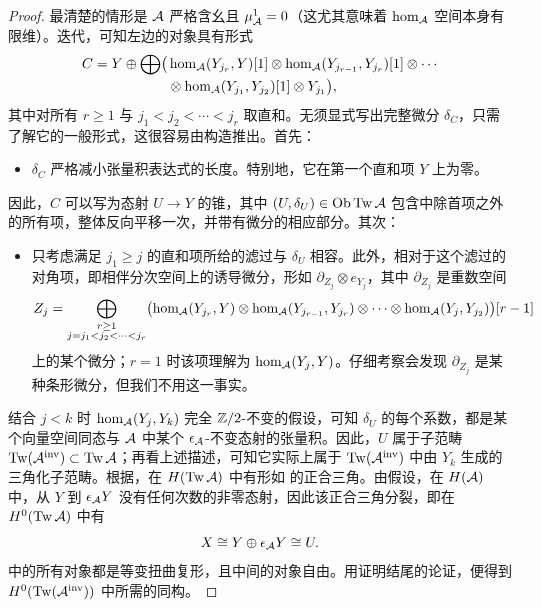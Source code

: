 \begin{proof}
最清楚的情形是 $\mathcal A$ 严格含幺且 $\mu^1_{\mathcal A}=0$（这尤其意味着 $\hom_{\mathcal A}$ 空间本身有限维）。迭代，可知左边的对象具有形式
\begin{equation}\label{eq:6.3}
\begin{aligned}
C=Y\oplus\bigoplus\bigl(&\hom_{\mathcal A}(Y_{j_r},Y)[1]\otimes\hom_{\mathcal A}(Y_{j_{r-1}},Y_{j_r})[1]\otimes\cdots\\[-2pt]
&\otimes\hom_{\mathcal A}(Y_{j_1},Y_{j_2})[1]\otimes Y_{j_1}\bigr),
\end{aligned}
\end{equation}
其中对所有 $r\geq1$ 与 $j_1<j_2<\cdots<j_r$ 取直和。无须显式写出完整微分 $\delta_C$，只需了解它的一般形式，这很容易由构造推出。首先：
\begin{itemize}
\item $\delta_C$ 严格减小张量积表达式的长度。特别地，它在第一个直和项 $Y$ 上为零。
\end{itemize}
因此，$C$ 可以写为态射 $U\to Y$ 的锥，其中 $(U,\delta_U)\in\operatorname{Ob}\operatorname{Tw}\mathcal A$ 包含中除首项之外的所有项，整体反向平移一次，并带有微分的相应部分。其次：
\begin{itemize}
\item 只考虑满足 $j_1\geq j$ 的直和项所给的滤过与 $\delta_U$ 相容。此外，相对于这个滤过的对角项，即相伴分次空间上的诱导微分，形如 $\partial_{Z_j}\otimes e_{Y_j}$，其中 $\partial_{Z_j}$ 是重数空间
\[
Z_j=\bigoplus_{\substack{r\geq1\\j=j_1<j_2<\cdots<j_r}}
\bigl(\hom_{\mathcal A}(Y_{j_r},Y)\otimes\hom_{\mathcal A}(Y_{j_{r-1}},Y_{j_r})\otimes\cdots\otimes\hom_{\mathcal A}(Y_j,Y_{j_2})\bigr)[r-1]
\]
上的某个微分；$r=1$ 时该项理解为 $\hom_{\mathcal A}(Y_j,Y)$。仔细考察会发现 $\partial_{Z_j}$ 是某种条形微分，但我们不用这一事实。
\end{itemize}
结合 $j<k$ 时 $\hom_{\mathcal A}(Y_j,Y_k)$ 完全 $\mathbb Z/2$-不变的假设，可知 $\delta_U$ 的每个系数，都是某个向量空间同态与 $\mathcal A$ 中某个 $\epsilon_{\mathcal A}$-不变态射的张量积。因此，$U$ 属于子范畴 $\operatorname{Tw}(\mathcal A^{\mathrm{inv}})\subset\operatorname{Tw}\mathcal A$；再看上述描述，可知它实际上属于 $\operatorname{Tw}(\mathcal A^{\mathrm{inv}})$ 中由 $Y_k$ 生成的三角化子范畴。根据，在 $H(\operatorname{Tw}\mathcal A)$ 中有形如
的正合三角。由假设，在 $H(\mathcal A)$ 中，从 $Y$ 到 $\epsilon_{\mathcal A}Y$ 没有任何次数的非零态射，因此该正合三角分裂，即在 $H^0(\operatorname{Tw}\mathcal A)$ 中有
\begin{equation}\label{eq:6.4}
X\cong Y\oplus\epsilon_{\mathcal A}Y\cong U.
\end{equation}
中的所有对象都是等变扭曲复形，且中间的对象自由。用证明结尾的论证，便得到 $H^0(\operatorname{Tw}(\mathcal A^{\mathrm{inv}}))$ 中所需的同构。


\end{proof}
